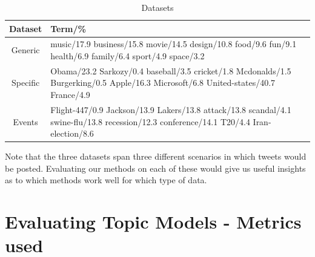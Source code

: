 \documentclass[10pt,a5paper,twoside]{article}
\begin{document}
\begin{table}[!h]
\centering
	\begin{tabular}{|c|p{4in}|}
	\hline
        Dataset & Term/\% \\
\hline
Generic &{\small music/17.9 business/15.8 movie/14.5 design/10.8
       food/9.6 fun/9.1 health/6.9 family/6.4 sport/4.9 space/3.2}  \\
Specific &{\small 
Obama/23.2 Sarkozy/0.4 baseball/3.5 cricket/1.8 Mcdonalds/1.5 Burgerking/0.5 Apple/16.3 Microsoft/6.8 United-states/40.7 France/4.9} \\
Events &{\small Flight-447/0.9 Jackson/13.9  Lakers/13.8 attack/13.8 scandal/4.1 swine-flu/13.8 recession/12.3 conference/14.1 T20/4.4 Iran-election/8.6  }\\
	\hline
	\end{tabular}
\caption{Datasets}\label{tbl-q}
\end{table}
Note that the three datasets span three different scenarios in which  tweets would be posted. Evaluating our methods on each of these would give us useful insights as to which methods work well for which type of data. 


\section{Evaluating Topic Models - Metrics used}
\end{document}
